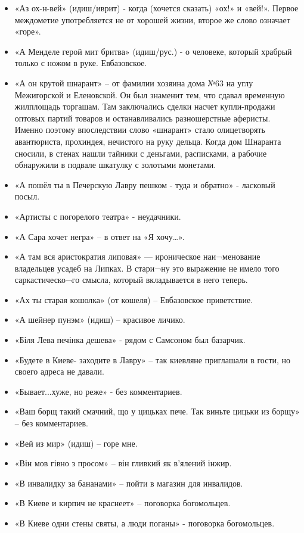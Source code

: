 \begin{itemize}
\item  «Аз ох-н-вей» (идиш/иврит) -  когда (хочется сказать) «ох!» и «вей!». Первое междометие употребляется не от хорошей жизни, второе же слово означает «горе». 
\item  «А Менделе герой мит бритва» (идиш/рус.) - о человеке, который храбрый только с ножом в руке. Евбазовское.
\item  «А он крутой шнарант» – от фамилии хозяина дома №63 на углу Межигорской и Еленовской. Он был знаменит тем, что сдавал временную жилплощадь торгашам. Там заключались сделки насчет купли-продажи оптовых партий товаров и останавливались разношерстные аферисты. Именно поэтому впоследствии слово «шнарант» стало олицетворять авантюриста, прохиндея, нечистого на руку дельца. Когда дом Шнаранта сносили, в стенах нашли тайники с деньгами, расписками, а рабочие обнаружили в подвале шкатулку с золотыми монетами.
\item  «А пошёл ты в Печерскую Лавру пешком - туда и обратно» - ласковый посыл.
\item  «Артисты с погорелого театра» - неудачники.
\item  «А Сара хочет негра» – в ответ на «Я хочу…».
\item  «А там вся аристократия липовая» — ироническое наи¬менование владельцев усадеб на Липках. В стари¬ну это выражение не имело того саркастическо¬го смысла, который вкладывается в него теперь.
\item  «Ах ты старая кошолка» (от кошеля) – Евбазовское приветствие.
\item  «А шейнер пунэм» (идиш) – красивое личико.
\item  «Біля Лева печінка дешева» - рядом с Самсоном был базарчик.
\item  «Будете в Киеве- заходите в Лавру» – так киевляне приглашали в гости, но своего адреса не давали.
\item  «Бывает...хуже, но реже» - без комментариев.
\item  «Ваш борщ такий смачний, що у цицьках пече. Так виньте цицьки из борщу» – без комментариев.
\item  «Вей из мир» (идиш) – горе мне.
\item  «Він мов гівно з просом» – він гливкий як в’ялений інжир. 
\item  «В инвалидку за бананами» – пойти в магазин для инвалидов.
\item  «В Киеве и кирпич не краснеет» – поговорка богомольцев. 
\item  «В Киеве одни стены святы, а люди поганы» - поговорка богомольцев.

\end{itemize}
